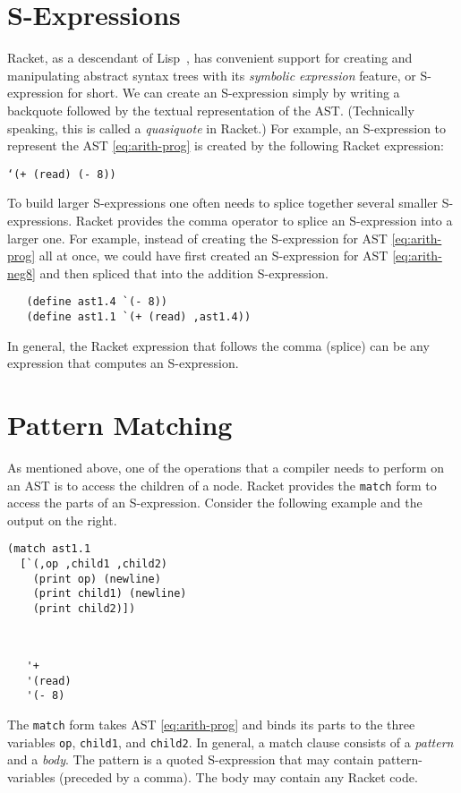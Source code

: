 \documentclass[12pt]{book}
\begin{document}
\section{S-Expressions}
\label{sec:s-expr}

Racket, as a descendant of Lisp~\citep{McCarthy:1960dz}, has
convenient support for creating and manipulating abstract syntax trees
with its \emph{symbolic expression} feature, or S-expression for
short. We can create an S-expression simply by writing a backquote
followed by the textual representation of the AST. (Technically
speaking, this is called a \emph{quasiquote} in Racket.)  For example,
an S-expression to represent the AST \eqref{eq:arith-prog} is created
by the following Racket expression:
\begin{center}
\texttt{`(+ (read) (- 8))}
\end{center}

To build larger S-expressions one often needs to splice together
several smaller S-expressions. Racket provides the comma operator to
splice an S-expression into a larger one. For example, instead of
creating the S-expression for AST \eqref{eq:arith-prog} all at once,
we could have first created an S-expression for AST
\eqref{eq:arith-neg8} and then spliced that into the addition
S-expression.
\begin{lstlisting}
   (define ast1.4 `(- 8))
   (define ast1.1 `(+ (read) ,ast1.4))
\end{lstlisting}
In general, the Racket expression that follows the comma (splice)
can be any expression that computes an S-expression.

\section{Pattern Matching}
\label{sec:pattern-matching}

As mentioned above, one of the operations that a compiler needs to
perform on an AST is to access the children of a node.  Racket
provides the \texttt{match} form to access the parts of an
S-expression. Consider the following example and the output on the
right.
\begin{center}
\begin{minipage}{0.5\textwidth}
\begin{lstlisting}
(match ast1.1
  [`(,op ,child1 ,child2)
    (print op) (newline)
    (print child1) (newline)
    (print child2)])
\end{lstlisting}
\end{minipage}
\vrule
\begin{minipage}{0.25\textwidth}
\begin{lstlisting}


   '+
   '(read)
   '(- 8)
\end{lstlisting}
\end{minipage}
\end{center}
The \texttt{match} form takes AST \eqref{eq:arith-prog} and binds its
parts to the three variables \texttt{op}, \texttt{child1}, and
\texttt{child2}. In general, a match clause consists of a
\emph{pattern} and a \emph{body}. The pattern is a quoted S-expression
that may contain pattern-variables (preceded by a comma).  The body
may contain any Racket code.
\end{document}
